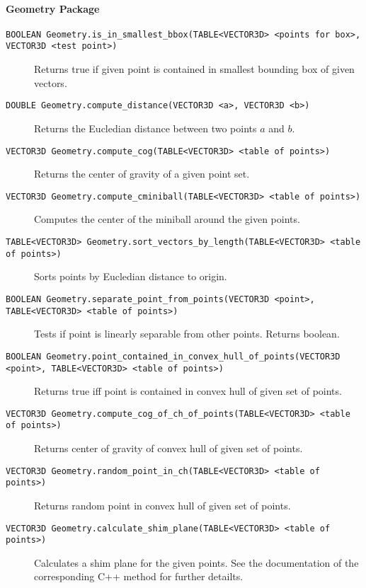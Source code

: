 \paragraph{Geometry Package}
\begin{description}
	\item [\texttt{BOOLEAN Geometry.is\_in\_smallest\_bbox(TABLE<VECTOR3D> <points for box>, VECTOR3D <test point>)}]
		Returns true if given point is contained in smallest bounding box of given vectors.
		
	\item [\texttt{DOUBLE Geometry.compute\_distance(VECTOR3D <a>, VECTOR3D <b>)}]
		Returns the Eucledian distance between two points $a$ and $b$.
		
	\item [\texttt{VECTOR3D Geometry.compute\_cog(TABLE<VECTOR3D> <table of points>)}]
		Returns the center of gravity of a given point set.

	\item [\texttt{VECTOR3D Geometry.compute\_cminiball(TABLE<VECTOR3D> <table of points>)}] 
		Computes the center of the miniball around the given points.
		
	\item [\texttt{TABLE<VECTOR3D> Geometry.sort\_vectors\_by\_length(TABLE<VECTOR3D> <table of points>)}] 
		Sorts points by Eucledian distance to origin.
		
	\item [\texttt{BOOLEAN Geometry.separate\_point\_from\_points(VECTOR3D <point>, TABLE<VECTOR3D> <table of points>)}] 
		Tests if point is linearly separable from other points. Returns boolean.		
		
	\item [\texttt{BOOLEAN Geometry.point\_contained\_in\_convex\_hull\_of\_points(VECTOR3D <point>, TABLE<VECTOR3D> <table of points>)}] 
		Returns true iff point is contained in convex hull of given set of points.
		
	\item [\texttt{VECTOR3D Geometry.compute\_cog\_of\_ch\_of\_points(TABLE<VECTOR3D> <table of points>)}] 
		Returns center of gravity of convex hull of given set of points.
		
	\item [\texttt{VECTOR3D Geometry.random\_point\_in\_ch(TABLE<VECTOR3D> <table of points>)}] 
		Returns random point in convex hull of given set of points.

	\item [\texttt{VECTOR3D Geometry.calculate\_shim\_plane(TABLE<VECTOR3D> <table of points>)}] 
		Calculates a shim plane for the given points. See the documentation of the corresponding C++ method for further detailts.
\end{description}


